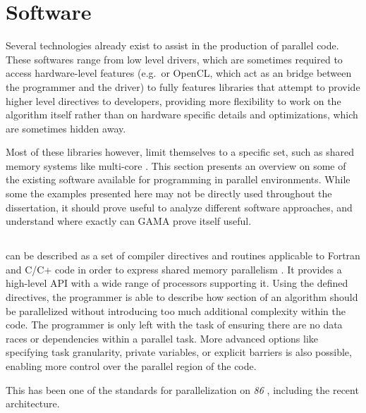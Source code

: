 \documentclass[main.tex]{subfiles}
\begin{document}
\section{Software}

Several technologies already exist to assist in the production of parallel code. These softwares range from low level drivers, which are sometimes required to access hardware-level features (e.g.\ \cuda or \acs{OpenCL}, which act as an bridge between the programmer and the \gpu driver) to fully features libraries that attempt to provide higher level directives to developers, providing more flexibility to work on the algorithm itself rather than on hardware specific details and optimizations, which are sometimes hidden away.

Most of these libraries however, limit themselves to a specific set, such as shared memory systems like multi-core \cpus\xspace. This section presents an overview on some of the existing software available for programming in parallel environments. While some the examples presented here may not be directly used throughout the dissertation, it should prove useful to analyze different software approaches, and understand where exactly can \acs{GAMA} prove itself useful.


\subsection{\openmp}

\openmp can be described as a set of compiler directives and routines applicable to Fortran and C/C+ code in order to express shared memory parallelism \cite{dagum1998openmp}. It provides a high-level API with a wide range of processors supporting it.
Using the defined directives, the programmer is able to describe how section of an algorithm should be parallelized without introducing too much additional complexity within the code. The programmer is only left with the task of ensuring there are no data races or dependencies within a parallel task. More advanced options like specifying task granularity, private variables, or explicit barriers is also possible, enabling more control over the parallel region of the code.

This has been one of the standards for parallelization on \textit{86} \cpus, including the recent \intel \mic architecture.


\subsection{\cuda}
\end{document}
